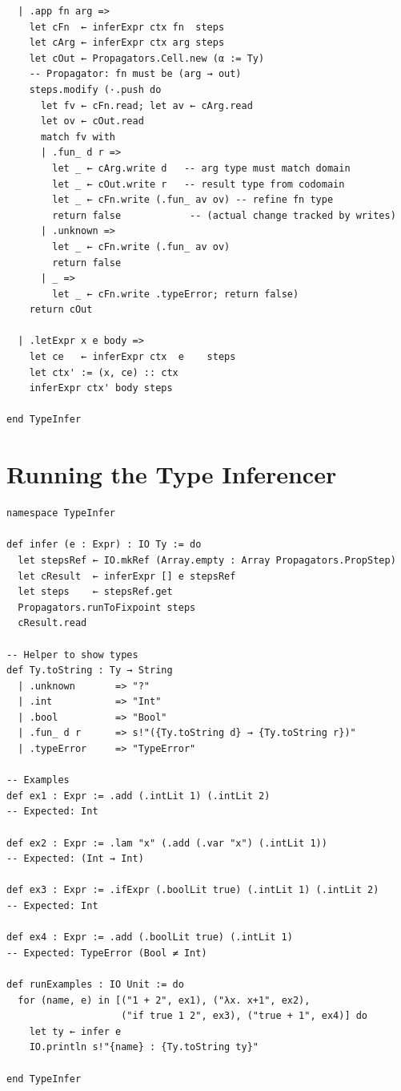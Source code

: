 \documentclass[12pt, a4paper, openright]{book}
\theoremstyle{thmstyle}
\theoremstyle{defstyle}
\begin{document}
\begin{verbatim}
  | .app fn arg =>
    let cFn  ← inferExpr ctx fn  steps
    let cArg ← inferExpr ctx arg steps
    let cOut ← Propagators.Cell.new (α := Ty)
    -- Propagator: fn must be (arg → out)
    steps.modify (·.push do
      let fv ← cFn.read; let av ← cArg.read
      let ov ← cOut.read
      match fv with
      | .fun_ d r =>
        let _ ← cArg.write d   -- arg type must match domain
        let _ ← cOut.write r   -- result type from codomain
        let _ ← cFn.write (.fun_ av ov) -- refine fn type
        return false            -- (actual change tracked by writes)
      | .unknown =>
        let _ ← cFn.write (.fun_ av ov)
        return false
      | _ =>
        let _ ← cFn.write .typeError; return false)
    return cOut

  | .letExpr x e body =>
    let ce   ← inferExpr ctx  e    steps
    let ctx' := (x, ce) :: ctx
    inferExpr ctx' body steps

end TypeInfer
\end{verbatim}

\section{Running the Type Inferencer}

\begin{verbatim}
namespace TypeInfer

def infer (e : Expr) : IO Ty := do
  let stepsRef ← IO.mkRef (Array.empty : Array Propagators.PropStep)
  let cResult  ← inferExpr [] e stepsRef
  let steps    ← stepsRef.get
  Propagators.runToFixpoint steps
  cResult.read

-- Helper to show types
def Ty.toString : Ty → String
  | .unknown       => "?"
  | .int           => "Int"
  | .bool          => "Bool"
  | .fun_ d r      => s!"({Ty.toString d} → {Ty.toString r})"
  | .typeError     => "TypeError"

-- Examples
def ex1 : Expr := .add (.intLit 1) (.intLit 2)
-- Expected: Int

def ex2 : Expr := .lam "x" (.add (.var "x") (.intLit 1))
-- Expected: (Int → Int)

def ex3 : Expr := .ifExpr (.boolLit true) (.intLit 1) (.intLit 2)
-- Expected: Int

def ex4 : Expr := .add (.boolLit true) (.intLit 1)
-- Expected: TypeError (Bool ≠ Int)

def runExamples : IO Unit := do
  for (name, e) in [("1 + 2", ex1), ("λx. x+1", ex2),
                    ("if true 1 2", ex3), ("true + 1", ex4)] do
    let ty ← infer e
    IO.println s!"{name} : {Ty.toString ty}"

end TypeInfer
\end{verbatim}
\end{document}
